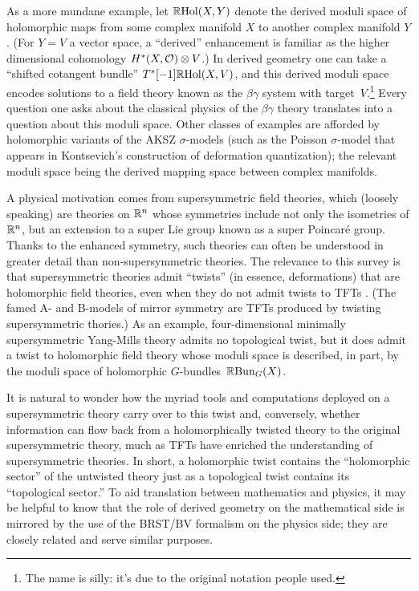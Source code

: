 \documentclass[11pt]{amsart}
\begin{document}
As a more mundane example, let $\mathbb R{\rm Hol}(X,Y)$ denote the derived moduli space of holomorphic maps from some complex manifold $X$ to another complex manifold $Y$.
(For $Y = V$ a vector space, a ``derived'' enhancement is familiar as the higher dimensional cohomology $H^*(X, \mathcal O) \otimes V$.)
In derived geometry one can take a ``shifted cotangent bundle'' $T^*[-1] \mathbb R{\rm Hol}(X,V)$,
and this derived moduli space encodes solutions to
a field theory known as the $\beta\gamma$ system with target~$V$.\footnote{The name is silly: it's due to the original notation people used.}
Every question one asks about the classical physics of the $\beta\gamma$ theory translates into a question about this moduli space.
Other classes of examples are afforded by holomorphic variants of the AKSZ $\sigma$-models (such as the Poisson $\sigma$-model that appears in Kontsevich's construction of deformation quantization); 
the relevant moduli space being the derived mapping space between complex manifolds. 

A physical motivation comes from supersymmetric field theories, 
which (loosely speaking) are theories on $\mathbb R^n$ whose symmetries include not only the isometries of $\mathbb R^n$, but an extension to a super Lie group known as a super Poincar\'e group.
Thanks to the enhanced symmetry, such theories can often be understood in greater detail than non-supersymmetric theories.
The relevance to this survey is that supersymmetric theories admit ``twists'' (in essence, deformations) that are holomorphic field theories, 
even when they do not admit twists to TFTs \cite{CosHol}. 
(The famed A- and B-models of mirror symmetry are TFTs produced by twisting supersymmetric thories.)
As an example, four-dimensional minimally supersymmetric Yang-Mills theory admits no topological twist, 
but it does admit a twist to holomorphic field theory whose moduli space is described, in part, by the moduli space of holomorphic $G$-bundles~$\mathbb R {\rm Bun}_G(X)$. 

It is natural to wonder how the myriad tools and computations deployed on a supersymmetric theory carry over to this twist 
and, conversely, whether information can flow back from a holomorphically twisted theory to the original supersymmetric theory, 
much as TFTs have enriched the understanding of supersymmetric theories.
In short, a holomorphic twist contains the ``holomorphic sector'' of the untwisted theory just as a topological twist contains its ``topological sector.''
To aid translation between mathematics and physics, 
it may be helpful to know that the role of derived geometry on the mathematical side is mirrored by the use of the BRST/BV formalism on the physics side;
they are closely related and serve similar purposes.
\end{document}
